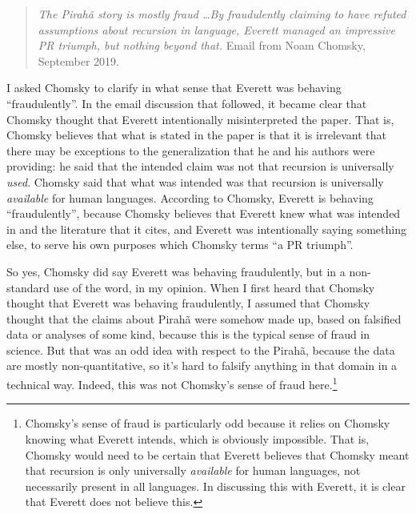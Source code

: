 \documentclass{article}
\begin{document}
\begin{quote}
    \textit{The Pirahã story is mostly fraud \ldots  By fraudulently claiming to have refuted assumptions about recursion in language, Everett managed an impressive PR triumph, but nothing beyond that.}  Email from Noam Chomsky, September 2019.
\end{quote}

I asked Chomsky to clarify in what sense that Everett was behaving ``fraudulently''. In the email discussion that followed, it became clear that Chomsky thought that Everett intentionally misinterpreted the \citet{hauser2002faculty} paper.  That is, Chomsky believes that what is stated in the \citet{hauser2002faculty} paper is that it is irrelevant that there may be exceptions to the generalization that he and his authors were providing: he said that the intended claim was not that recursion is universally \textit{used}. Chomsky said that what was intended was that recursion is universally \textit{available} for human languages. According to Chomsky, Everett is behaving ``fraudulently'', because Chomsky believes that Everett knew what was intended in \citet{hauser2002faculty} and the literature that it cites, and Everett was intentionally saying something else, to serve his own purposes which Chomsky terms ``a PR triumph''. 

So yes, Chomsky did say Everett was behaving fraudulently, but in a non-standard use of the word, in my opinion. When I first heard that Chomsky thought that Everett was behaving fraudulently, I assumed that Chomsky thought that the claims about Pirahã were somehow made up, based on falsified data or analyses of some kind, because this is the typical sense of fraud in science.  But that was an odd idea with respect to the Pirahã, because the data are mostly non-quantitative, so it's hard to falsify anything in that domain in a technical way. Indeed, this was not Chomsky's sense of fraud here.\footnote{Chomsky's sense of fraud is particularly odd because it relies on Chomsky knowing what Everett intends, which is obviously impossible. That is, Chomsky would need to be certain that Everett believes that Chomsky meant that recursion is only universally \textit{available} for human languages, not necessarily present in all languages. In discussing this with Everett, it is clear that Everett does not believe this.}
\end{document}
